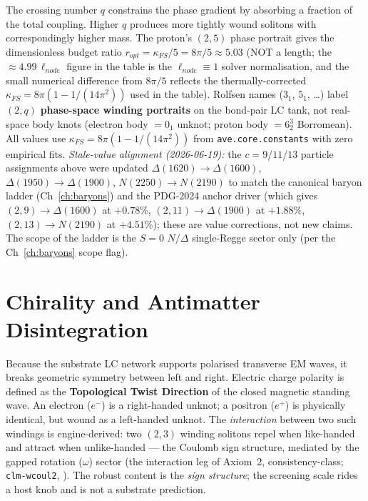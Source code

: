 The crossing number $q$ constrains the phase gradient by absorbing a fraction of the total coupling. Higher $q$ produces more tightly wound solitons with correspondingly higher mass. The proton's $(2,5)$ phase portrait gives the dimensionless budget ratio $r_{opt} = \kappa_{FS}/5 = 8\pi/5 \approx 5.03$ (NOT a length; the $\approx 4.99\,\ell_{node}$ figure in the table is the $\ell_{node}\equiv 1$ solver normalisation, and the small numerical difference from $8\pi/5$ reflects the thermally-corrected $\kappa_{FS} = 8\pi(1-1/(14\pi^2))$ used in the table). Rolfsen names ($3_1$, $5_1$, \ldots) label $(2,q)$ \textbf{phase-space winding portraits} on the bond-pair LC tank, not real-space body knots (electron body $= 0_1$ unknot; proton body $= 6^3_2$ Borromean). All values use $\kappa_{FS} = 8\pi(1 - 1/(14\pi^2))$ from \texttt{ave.core.constants} with zero empirical fits. \emph{Stale-value alignment (2026-06-19):} the $c = 9$/$11$/$13$ particle assignments above were updated $\Delta(1620) \to \Delta(1600)$, $\Delta(1950) \to \Delta(1900)$, $N(2250) \to N(2190)$ to match the canonical baryon ladder (Ch~\ref{ch:baryons}) and the PDG-2024 anchor driver  (which gives $(2,9) \to \Delta(1600)$ at $+0.78\%$, $(2,11) \to \Delta(1900)$ at $+1.88\%$, $(2,13) \to N(2190)$ at $+4.51\%$); these are value corrections, not new claims. The scope of the ladder is the $S=0$ $N/\Delta$ single-Regge sector only (per the Ch~\ref{ch:baryons} scope flag).

\section{Chirality and Antimatter Disintegration}
Because the substrate LC network supports polarised transverse EM waves, it breaks geometric symmetry between left and right. Electric charge polarity is defined as the \textbf{Topological Twist Direction} of the closed magnetic standing wave. An electron ($e^-$) is a right-handed unknot; a positron ($e^+$) is physically identical, but wound as a left-handed unknot. The \emph{interaction} between two such windings is engine-derived: two $(2,3)$ winding solitons repel when like-handed and attract when unlike-handed --- the Coulomb sign structure, mediated by the gapped rotation ($\omega$) sector (the interaction leg of Axiom~2, consistency-class; \texttt{clm-wcoul2}, ). The robust content is the \emph{sign structure}; the screening scale rides a host knob and is not a substrate prediction.

